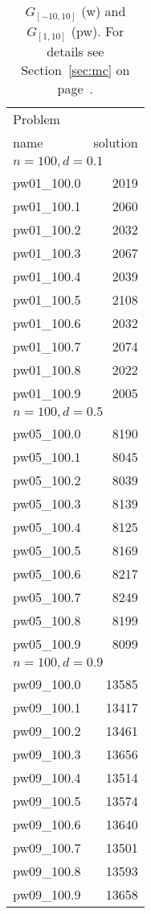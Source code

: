 \documentclass[a4paper, 12pt]{article}
\begin{document}
\begin{table}
\begin{center}
\begin{minipage}{30ex}
\begin{tabular}{|l|r|}
\hline
Problem & \\
name & solution \\
\hline
\multicolumn{2}{|l|}{$n=100, d=0.1$}\\
\hline
pw01\_100.0 & 2019 \\
pw01\_100.1 & 2060 \\
pw01\_100.2 & 2032 \\
pw01\_100.3 & 2067 \\
pw01\_100.4 & 2039 \\
pw01\_100.5 & 2108 \\
pw01\_100.6 & 2032 \\
pw01\_100.7 & 2074 \\
pw01\_100.8 & 2022 \\
pw01\_100.9 & 2005 \\
\hline
\multicolumn{2}{|l|}{$n=100, d=0.5$}\\
\hline
pw05\_100.0 & 8190 \\
pw05\_100.1 & 8045 \\
pw05\_100.2 & 8039 \\
pw05\_100.3 & 8139 \\
pw05\_100.4 & 8125 \\
pw05\_100.5 & 8169 \\
pw05\_100.6 & 8217 \\
pw05\_100.7 & 8249 \\
pw05\_100.8 & 8199 \\
pw05\_100.9 & 8099 \\
\hline
\multicolumn{2}{|l|}{$n=100, d=0.9$}\\
\hline
pw09\_100.0 & 13585 \\
pw09\_100.1 & 13417 \\
pw09\_100.2 & 13461 \\
pw09\_100.3 & 13656 \\
pw09\_100.4 & 13514 \\
pw09\_100.5 & 13574 \\
pw09\_100.6 & 13640 \\
pw09\_100.7 & 13501 \\
pw09\_100.8 & 13593 \\
pw09\_100.9 & 13658 \\
\hline
\end{tabular}
\end{minipage}
\caption{$G_{[-10,10]}$ (w) and $G_{[1,10]}$ (pw).  For details see
  Section~\ref{sec:mc} on page~\pageref{sec:mc}.} \label{tab:pw}
\end{center} \end{table}
\end{document}
